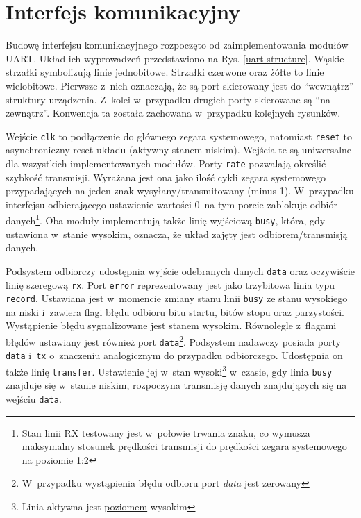 \section{Interfejs komunikacyjny}

Budowę interfejsu komunikacyjnego rozpoczęto od zaimplementowania modułów UART. Układ ich wyprowadzeń przedstawiono na Rys. \ref{uart-structure}. Wąskie strzałki symbolizują linie jednobitowe. Strzałki czerwone oraz żółte to linie wielobitowe. Pierwsze z~nich oznaczają, że są port skierowany jest do ``wewnątrz'' struktury urządzenia. Z~kolei w~przypadku drugich porty skierowane są ``na zewnątrz''. Konwencja ta została zachowana w~przypadku kolejnych rysunków.

Wejście \verb|clk| to podłączenie do głównego zegara systemowego, natomiast \verb|reset| to asynchroniczny reset układu (aktywny stanem niskim). Wejścia te są uniwersalne dla wszystkich implementowanych modułów. Porty \verb|rate| pozwalają określić szybkość transmisji. Wyrażana jest ona jako ilość cykli zegara systemowego przypadających na jeden znak wysyłany/transmitowany (minus 1). W~przypadku interfejsu odbierającego ustawienie wartości 0~na tym porcie zablokuje odbiór danych\footnote{Stan linii RX testowany jest w~połowie trwania znaku, co wymusza maksymalny stosunek prędkości transmisji do prędkości zegara systemowego na poziomie 1:2}. Oba moduły implementują także linię wyjściową \verb|busy|, która, gdy ustawiona w~stanie wysokim, oznacza, że układ zajęty jest odbiorem/transmisją danych. 

Podsystem odbiorczy udostępnia wyjście odebranych danych \verb|data| oraz oczywiście linię szeregową \verb|rx|. Port \verb|error| reprezentowany jest jako trzybitowa linia typu \verb|record|. Ustawiana jest w~momencie zmiany stanu linii \verb|busy| ze stanu wysokiego na niski i~zawiera flagi błędu odbioru bitu startu, bitów stopu oraz parzystości. Wystąpienie błędu sygnalizowane jest stanem wysokim. Równolegle z~flagami błędów ustawiany jest również port \verb|data|\footnote{W~przypadku wystąpienia błędu odbioru port \textit{data} jest zerowany}. Podsystem nadawczy posiada porty \verb|data| i~\verb|tx| o~znaczeniu analogicznym do przypadku odbiorczego. Udostępnia on także linię \verb|transfer|. Ustawienie jej w~stan wysoki\footnote{Linia aktywna jest \underline{poziomem} wysokim} w~czasie, gdy linia \verb|busy| znajduje się w~stanie niskim, rozpoczyna transmisję danych znajdujących się na wejściu \verb|data|.

